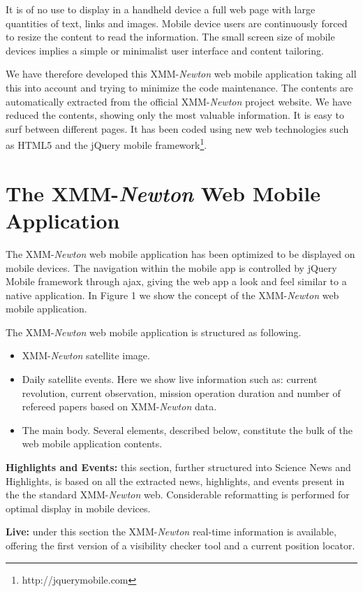 It is of no use to display in a handheld device a full web page with large quantities of text, links and images. Mobile device users are continuously forced to resize the content to read the information. The small screen size of mobile devices implies a simple or minimalist user interface and content tailoring.

We have therefore developed this XMM-{\em Newton} web mobile application taking all this into account and trying to minimize the code maintenance. The contents are automatically extracted from the official XMM-{\em Newton} project website. We have reduced the contents, showing only the most valuable information. It is easy to surf between different pages. It has been coded using new web technologies such as HTML5 and the jQuery mobile framework\footnote{http://jquerymobile.com}.

\section{The XMM-{\em Newton} Web Mobile Application}

The XMM-{\em Newton} web mobile application has been optimized to be displayed on mobile devices. The navigation within the mobile app is controlled by jQuery Mobile framework through ajax, giving the web app a look and feel similar to a native application. In Figure 1 we show the concept of the XMM-{\em Newton} web mobile application.

The XMM-{\em Newton} web mobile application is structured as following.
\begin{itemize}
\item XMM-{\em Newton} satellite image.
\item Daily satellite events. Here we show live information such as: current revolution, current observation, mission operation duration and number of refereed papers based on 
XMM-{\em Newton} data.
\item The main body. Several elements, described below, constitute the bulk of the web mobile application contents.
\end{itemize}

{\bf Highlights and Events:} this section, further structured into Science News and Highlights, is based on all the extracted news, highlights, and events present in the the standard XMM-{\em Newton} web. Considerable reformatting is performed for optimal display in mobile devices.

{\bf Live:} under this section the XMM-{\em Newton} real-time information is available, offering the first version of a visibility checker tool and a current position locator.

